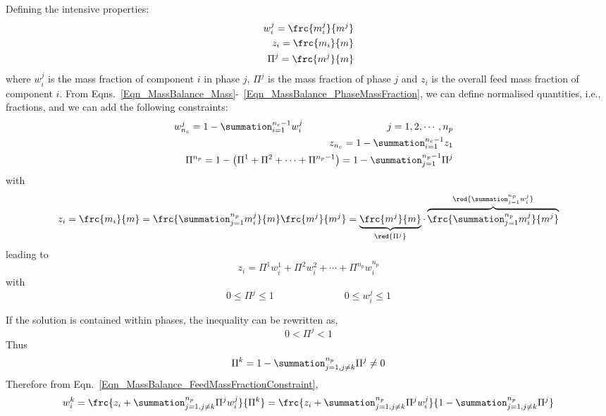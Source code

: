 Defining the intensive properties:
\begin{eqnarray}
w_{i}^{j} = \frc{m_{i}^{j}}{m^{j}} \label{Eqn_MassBalance_MassFraction} \\
z_{i} = \frc{m_{i}}{m} \label{Eqn_MassBalance_MassFractionFeeding} \\
\Pi^{j} = \frc{m^{j}}{m}\label{Eqn_MassBalance_PhaseMassFraction} 
\end{eqnarray}
where $w_{i}^{j}$ is the mass fraction of component $i$ in phase $j$, $\Pi^{j}$ is the mass fraction of phase $j$ and $z_{i}$ is the overall feed mass fraction of component $i$. From Eqns.~\ref{Eqn_MassBalance_Mass}-~\ref{Eqn_MassBalance_PhaseMassFraction}, we can define normalised quantities, i.e., fractions, and we can add the following constraints:
\begin{eqnarray}
&&w_{n_{c}}^{j} = 1 - \summation_{i=1}^{n_{c}-1}w_{i}^{j}  \hspace{3cm} j=1,2,\cdots,n_{p}  \label{Eqn_MassBalance_MassFraction2} \\
&&z_{n_{c}} = 1 - \summation_{i=1}^{n_{c}-1}z_{1}  \\
&&\Pi^{n_{p}} = 1 - \left(\Pi^{1} + \Pi^{2} + \cdots + \Pi^{n_{p}-1}\right) = 1 - \summation_{j=1}^{n_{p}-1} \Pi^{j}\label{Eqn_MassBalance_PhaseMassFraction2}
\end{eqnarray} 
with
\begin{displaymath}
  z_{i} = \frc{m_{i}}{m} = \frc{\summation_{j=1}^{n_{p}}m_{i}^{j}}{m} \frc{m^{j}}{m^{j}} = \underbrace{\frc{m^{j}}{m}}_{\red{\Pi^{j}}} \cdot \overbrace{\frc{\summation_{j=1}^{n_{p}}m_{i}^{j}}{m^{j}}}^{\red{\summation_{j=1}^{n_{p}}w_{i}^{j}}} 
\end{displaymath}
leading to
\begin{equation}
z_{i} = \Pi^{1}w_{i}^{1} + \Pi^{2}w_{i}^{2} + \cdots + \Pi^{n_{p}}w_{i}^{n_{p}}
\label{Eqn_MassBalance_FeedMassFractionConstraint}
\end{equation}
with
\begin{equation}
0\leq\Pi^{j}\leq 1 \hspace{3cm} 0\leq w_{i}^{j}\leq 1
\end{equation}

If the solution is contained within  phases, the inequality can be rewritten as,
\begin{equation}
0 < \Pi^{j} < 1
\end{equation}
Thus 
\begin{displaymath}
\Pi^{k} = 1 - \summation_{j=1,j\neq k}^{n_{p}} \Pi^{j} \neq 0
\end{displaymath}
Therefore from Eqn.~\ref{Eqn_MassBalance_FeedMassFractionConstraint},
\begin{equation}
w_{i}^{k} = \frc{z_{i}+\summation_{j=1,j\neq k}^{n_{p}}\Pi^{j}w_{i}^{j}}{\Pi^{k}} = \frc{z_{i} + \summation_{j=1,j\neq k}^{n_{p}}\Pi^{j}w_{i}^{j}}{1-\summation_{j=1,j\neq k}^{n_{p}}\Pi^{j}}
\label{Eqn_MassBalance_FeedMassFractionConstraint2}
\end{equation}



